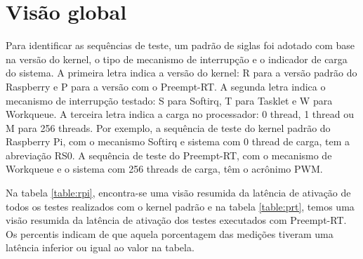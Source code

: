 \section{Visão global}

Para identificar as sequências de teste, um padrão de siglas foi adotado com base na versão do kernel, o tipo de mecanismo de interrupção e o indicador de carga do sistema. A primeira letra indica a versão do kernel: R para a versão padrão do Raspberry e P para a versão com o Preempt-RT. A segunda letra indica o mecanismo de interrupção testado: S para Softirq, T para Tasklet e W para Workqueue. A terceira letra indica a carga no processador: 0 thread, 1 thread ou M para 256 threads. Por exemplo, a sequência de teste do kernel padrão do Raspberry Pi, com o mecanismo Softirq e sistema com 0 thread de carga, tem a abreviação RS0. A sequência de teste do Preempt-RT, com o mecanismo de Workqueue e o sistema com 256 threads de carga, têm o acrônimo PWM.

Na tabela \ref{table:rpi}, encontra-se uma visão resumida da latência de ativação de todos os testes realizados com o kernel padrão e na tabela \ref{table:prt}, temos uma visão resumida da latência de ativação dos testes executados com Preempt-RT. Os percentis indicam de que aquela porcentagem das medições tiveram uma latência inferior ou igual ao valor na tabela.

